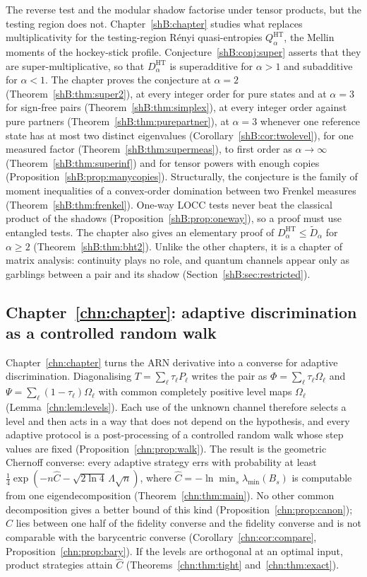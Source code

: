 The reverse test and the modular shadow factorise under tensor products, but the testing region does not. Chapter~\ref{shB:chapter} studies what replaces multiplicativity for the testing-region R\'enyi quasi-entropies $Q^{\mathrm{HT}}_\alpha$, the Mellin moments of the hockey-stick profile. Conjecture~\ref{shB:conj:super} asserts that they are super-multiplicative, so that $D^{\mathrm{HT}}_\alpha$ is superadditive for $\alpha>1$ and subadditive for $\alpha<1$. The chapter proves the conjecture at $\alpha=2$ (Theorem~\ref{shB:thm:super2}), at every integer order for pure states and at $\alpha=3$ for sign-free pairs (Theorem~\ref{shB:thm:simplex}), at every integer order against pure partners (Theorem~\ref{shB:thm:purepartner}), at $\alpha=3$ whenever one reference state has at most two distinct eigenvalues (Corollary~\ref{shB:cor:twolevel}), for one measured factor (Theorem~\ref{shB:thm:supermeas}), to first order as $\alpha\to\infty$ (Theorem~\ref{shB:thm:superinf}) and for tensor powers with enough copies (Proposition~\ref{shB:prop:manycopies}). Structurally, the conjecture is the family of moment inequalities of a convex-order domination between two Frenkel measures (Theorem~\ref{shB:thm:frenkel}). One-way LOCC tests never beat the classical product of the shadows (Proposition~\ref{shB:prop:oneway}), so a proof must use entangled tests. The chapter also gives an elementary proof of $D^{\mathrm{HT}}_\alpha\le\widetilde D_\alpha$ for $\alpha\ge2$ (Theorem~\ref{shB:thm:bht2}). Unlike the other chapters, it is a chapter of matrix analysis: continuity plays no role, and quantum channels appear only as garblings between a pair and its shadow (Section~\ref{shB:sec:restricted}).

\subsection*{Chapter~\ref{chn:chapter}: adaptive discrimination as a controlled random walk}

Chapter~\ref{chn:chapter} turns the ARN derivative into a converse for adaptive discrimination. Diagonalising $T=\sum_\ell\tau_\ell P_\ell$ writes the pair as $\Phi=\sum_\ell\tau_\ell\Omega_\ell$ and $\Psi=\sum_\ell(1-\tau_\ell)\Omega_\ell$ with common completely positive level maps $\Omega_\ell$ (Lemma~\ref{chn:lem:levels}). Each use of the unknown channel therefore selects a level and then acts in a way that does not depend on the hypothesis, and every adaptive protocol is a post-processing of a controlled random walk whose step values are fixed (Proposition~\ref{chn:prop:walk}). The result is the geometric Chernoff converse: every adaptive strategy errs with probability at least $\frac14\exp(-n\widehat C-\sqrt{2\ln4}\,\Lambda\sqrt n)$, where $\widehat C=-\ln\min_s\lambda_{\min}(B_s)$ is computable from one eigendecomposition (Theorem~\ref{chn:thm:main}). No other common decomposition gives a better bound of this kind (Proposition~\ref{chn:prop:canon}); $\widehat C$ lies between one half of the fidelity converse and the fidelity converse and is not comparable with the barycentric converse (Corollary~\ref{chn:cor:compare}, Proposition~\ref{chn:prop:bary}). If the levels are orthogonal at an optimal input, product strategies attain $\widehat C$ (Theorems~\ref{chn:thm:tight} and~\ref{chn:thm:exact}).

